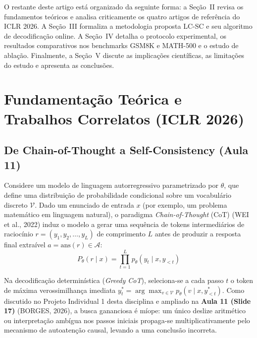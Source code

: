 \documentclass[9pt,conference]{IEEEtran}
\begin{document}
O restante deste artigo est\'{a} organizado da seguinte forma: a Se\c{c}\~{a}o~II revisa os fundamentos te\'{o}ricos e analisa criticamente os quatro artigos de refer\^{e}ncia do ICLR 2026. A Se\c{c}\~{a}o~III formaliza a metodologia proposta LC-SC e seu algoritmo de decodifica\c{c}\~{a}o online. A Se\c{c}\~{a}o~IV detalha o protocolo experimental, os resultados comparativos nos benchmarks GSM8K e MATH-500 e o estudo de abla\c{c}\~{a}o. Finalmente, a Se\c{c}\~{a}o~V discute as implica\c{c}\~{o}es cient\'{i}ficas, as limita\c{c}\~{o}es do estudo e apresenta as conclus\~{o}es.

\section{Fundamenta\c{c}\~{a}o Te\'{o}rica e Trabalhos Correlatos (ICLR 2026)}

\subsection{De Chain-of-Thought a Self-Consistency (Aula 11)}

Considere um modelo de linguagem autorregressivo parametrizado por $\theta$, que define uma distribui\c{c}\~{a}o de probabilidade condicional sobre um vocabul\'{a}rio discreto $\mathcal{V}$. Dado um enunciado de entrada $x$ (por exemplo, um problema matem\'{a}tico em linguagem natural), o paradigma \textit{Chain-of-Thought} (CoT) (WEI et al., 2022) induz o modelo a gerar uma sequ\^{e}ncia de tokens intermedi\'{a}rios de racioc\'{i}nio $r = (y_1, y_2, \dots, y_L)$ de comprimento $L$ antes de produzir a resposta final extra\'{i}vel $a = \text{ans}(r) \in \mathcal{A}$:
\begin{equation}
P_\theta(r \mid x) = \prod_{t=1}^{L} p_\theta(y_t \mid x, y_{<t})
\label{eq:cot_prob}
\end{equation}

Na decodifica\c{c}\~{a}o determin\'{i}stica (\textit{Greedy CoT}), seleciona-se a cada passo $t$ o token de m\'{a}xima verossimilhan\c{c}a imediata $y_t^* = \arg\max_{v \in \mathcal{V}} p_\theta(v \mid x, y_{<t}^*)$. Como discutido no Projeto Individual 1 desta disciplina e ampliado na \textbf{Aula 11 (Slide 17)} (BORGES, 2026), a busca gananciosa \'{e} míope: um \'{u}nico deslize aritm\'{e}tico ou interpreta\c{c}\~{a}o amb\'{i}gua nos passos iniciais propaga-se multiplicativamente pelo mecanismo de autoaten\c{c}\~{a}o causal, levando a uma conclus\~{a}o incorreta.
\end{document}
